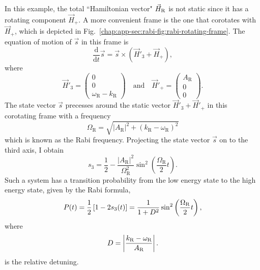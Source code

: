 

In this example, the total ``Hamiltonian vector" $\vec H_\mathrm R$ is not static since it has a rotating component $\vec H_+$. A more convenient frame is the one that corotates with $\vec{H}_+$, which is depicted in Fig.~\ref{chap:app-sec:rabi-fig:rabi-rotating-frame}. The equation of motion of $\vec s$ in this frame is
\begin{equation}
\frac{\mathrm d}{\mathrm d t } \vec{s} = \vec{s} \times (\vec{H}'_3 + \vec{H}_+),
\end{equation}
where
\begin{equation}
\vec{H}'_3 = \begin{pmatrix}
    0 \\ 0 \\ 　\omega_{\mathrm{R}} - k_{\mathrm R}
  \end{pmatrix} \quad \text{and} \quad \vec{H}'_+ = \begin{pmatrix}
    A_{\mathrm{R}} \\ 0 \\ 　0
    \end{pmatrix}.
\end{equation}
The state vector $\vec{s}$ precesses around the static vector $\vec{H}'_3 + \vec{H}'_+$ in this corotating frame with a frequency
\begin{equation}
    \Omega_{\mathrm R} = \sqrt{ \lvert A_{\mathrm{R}}\rvert^2 + (k_{\mathrm{R}} - \omega_{\mathrm R})^2 }
    \label{app:rabi-frequency}
\end{equation}
which is known as the Rabi frequency.
Projecting the state vector $\vec{s}$ on to the third axis, I obtain
\begin{equation}
s_3 = \frac{1}{2} - \frac{\lvert A_{\mathrm R}\rvert ^2}{\Omega_{\mathrm R}^2}\sin^2\left(\frac{\Omega_{\mathrm R}}{2} t\right).
\end{equation}
Such a system has a transition probability from the low energy state to the high energy state, given by the Rabi formula,
\begin{equation}
    P(t) = \frac{1}{2}\left[ 1- 2 s_3(t) \right] = \frac{1}{ 1 + \RD^2 } \sin^2 \left( \frac{\Omega_{\mathrm R}}{2} t \right),
    \label{app:rabi-system-transition-probability}
\end{equation}
where
\begin{equation}
    \RD = \left\lvert \frac{ k_{\mathrm R} - \omega_{\mathrm R}}{A_{\mathrm R}} \right\rvert.
    \label{chap:app-sec:rabi-oscillations-eqn:relative-detuning-def}
\end{equation}
is the relative detuning.

